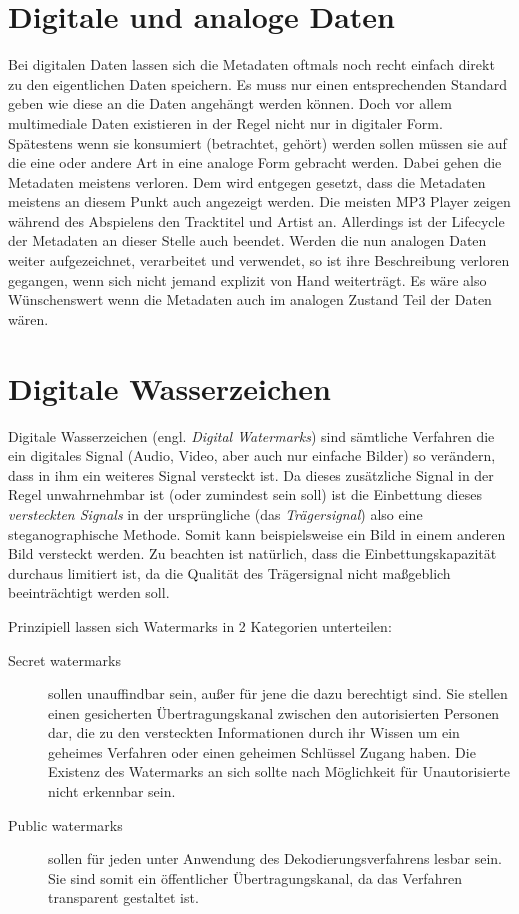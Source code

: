 \section{Digitale und analoge Daten}

Bei digitalen Daten lassen sich die Metadaten oftmals noch recht einfach direkt zu den eigentlichen Daten speichern. Es muss nur einen entsprechenden Standard geben wie diese an die Daten angehängt werden können. Doch vor allem multimediale Daten existieren in der Regel nicht nur in digitaler Form. Spätestens wenn sie konsumiert (betrachtet, gehört) werden sollen müssen sie auf die eine oder andere Art in eine analoge Form gebracht werden. Dabei gehen die Metadaten meistens verloren. Dem wird entgegen gesetzt, dass die Metadaten meistens an diesem Punkt auch angezeigt werden. Die meisten MP3 Player zeigen während des Abspielens den Tracktitel und Artist an. Allerdings ist der Lifecycle der Metadaten an dieser Stelle auch beendet. Werden die nun analogen Daten weiter aufgezeichnet, verarbeitet und verwendet, so ist ihre Beschreibung verloren gegangen, wenn sich nicht jemand explizit \glqq{}von Hand\grqq{} weiterträgt. Es wäre also Wünschenswert wenn die Metadaten auch im analogen Zustand Teil der Daten wären. 

\section{Digitale Wasserzeichen}

Digitale Wasserzeichen (engl. \textit{Digital Watermarks}) sind sämtliche Verfahren die ein digitales Signal (Audio, Video, aber auch nur einfache Bilder) so verändern, dass in ihm ein weiteres Signal versteckt ist. Da dieses zusätzliche Signal in der Regel unwahrnehmbar ist (oder zumindest sein soll) ist die Einbettung dieses \textit{versteckten Signals} in der ursprüngliche (das \textit{Trägersignal}) also eine steganographische Methode.
Somit kann beispielsweise ein Bild in einem anderen Bild versteckt werden. Zu beachten ist natürlich, dass die Einbettungskapazität durchaus limitiert ist, da die Qualität des Trägersignal nicht maßgeblich beeinträchtigt werden soll. 

Prinzipiell lassen sich Watermarks in 2 Kategorien unterteilen\cite{arnold2000audio}: 

\begin{description}
	
	\item[Secret watermarks] sollen unauffindbar sein, außer für jene die dazu berechtigt sind. Sie stellen einen gesicherten Übertragungskanal zwischen den autorisierten Personen dar, die zu den versteckten Informationen durch ihr Wissen um ein geheimes Verfahren oder einen geheimen Schlüssel Zugang haben. Die Existenz des Watermarks an sich sollte nach Möglichkeit für Unautorisierte nicht erkennbar sein. 
	
	\item[Public watermarks] sollen für jeden unter Anwendung des Dekodierungsverfahrens lesbar sein. Sie sind somit ein öffentlicher Übertragungskanal, da das Verfahren transparent gestaltet ist.
	
\end{description}

